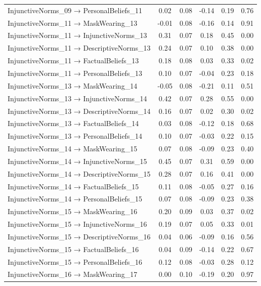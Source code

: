 \documentclass[
  man, donotrepeattitle,floatsintext]{apa6}
\begin{document}
\begin{center}
\begin{ThreePartTable}
{\begin{longtable}{lccccc}
InjunctiveNorms\_09 → PersonalBeliefs\_11 & 0.02 & 0.08 & -0.14 & 0.19 & 0.76\\
InjunctiveNorms\_11 → MaskWearing\_13 & -0.01 & 0.08 & -0.16 & 0.14 & 0.91\\
InjunctiveNorms\_11 → InjunctiveNorms\_13 & 0.31 & 0.07 & 0.18 & 0.45 & 0.00\\
InjunctiveNorms\_11 → DescriptiveNorms\_13 & 0.24 & 0.07 & 0.10 & 0.38 & 0.00\\
InjunctiveNorms\_11 → FactualBeliefs\_13 & 0.18 & 0.08 & 0.03 & 0.33 & 0.02\\
InjunctiveNorms\_11 → PersonalBeliefs\_13 & 0.10 & 0.07 & -0.04 & 0.23 & 0.18\\
InjunctiveNorms\_13 → MaskWearing\_14 & -0.05 & 0.08 & -0.21 & 0.11 & 0.51\\
InjunctiveNorms\_13 → InjunctiveNorms\_14 & 0.42 & 0.07 & 0.28 & 0.55 & 0.00\\
InjunctiveNorms\_13 → DescriptiveNorms\_14 & 0.16 & 0.07 & 0.02 & 0.30 & 0.02\\
InjunctiveNorms\_13 → FactualBeliefs\_14 & 0.03 & 0.08 & -0.12 & 0.18 & 0.68\\
InjunctiveNorms\_13 → PersonalBeliefs\_14 & 0.10 & 0.07 & -0.03 & 0.22 & 0.15\\
InjunctiveNorms\_14 → MaskWearing\_15 & 0.07 & 0.08 & -0.09 & 0.23 & 0.40\\
InjunctiveNorms\_14 → InjunctiveNorms\_15 & 0.45 & 0.07 & 0.31 & 0.59 & 0.00\\
InjunctiveNorms\_14 → DescriptiveNorms\_15 & 0.28 & 0.07 & 0.16 & 0.41 & 0.00\\
InjunctiveNorms\_14 → FactualBeliefs\_15 & 0.11 & 0.08 & -0.05 & 0.27 & 0.16\\
InjunctiveNorms\_14 → PersonalBeliefs\_15 & 0.07 & 0.08 & -0.09 & 0.23 & 0.38\\
InjunctiveNorms\_15 → MaskWearing\_16 & 0.20 & 0.09 & 0.03 & 0.37 & 0.02\\
InjunctiveNorms\_15 → InjunctiveNorms\_16 & 0.19 & 0.07 & 0.05 & 0.33 & 0.01\\
InjunctiveNorms\_15 → DescriptiveNorms\_16 & 0.04 & 0.06 & -0.09 & 0.16 & 0.56\\
InjunctiveNorms\_15 → FactualBeliefs\_16 & 0.04 & 0.09 & -0.14 & 0.22 & 0.67\\
InjunctiveNorms\_15 → PersonalBeliefs\_16 & 0.12 & 0.08 & -0.03 & 0.28 & 0.12\\
InjunctiveNorms\_16 → MaskWearing\_17 & 0.00 & 0.10 & -0.19 & 0.20 & 0.97\\

\end{longtable}}
\end{ThreePartTable}
\end{center}
\end{document}
